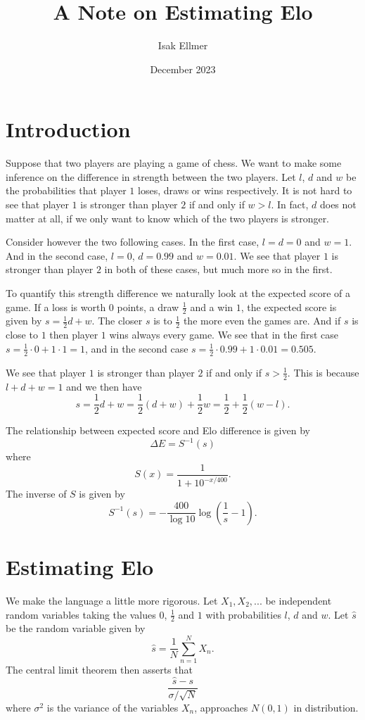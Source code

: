 \documentclass{article}
\title{A Note on Estimating Elo}
\author{Isak Ellmer}
\date{December 2023}
\theoremstyle{plain}
\theoremstyle{definition}
\begin{document}
\maketitle

\section{Introduction}
Suppose that two players are playing a game of chess. We want to make some inference
on the difference in strength between the two players. Let $l$, $d$ and $w$ be the
probabilities that player $1$ loses, draws or wins respectively. It is not hard to see
that player $1$ is stronger than player $2$ if and only if $w>l$. In fact, $d$ does not
matter at all, if we only want to know which of the two players is stronger.

Consider however the two following cases. In the first case, $l=d=0$ and $w=1$. And in
the second case, $l=0$, $d=0.99$ and $w=0.01$. We see that player $1$ is stronger than
player $2$ in both of these cases, but much more so in the first.

To quantify this
strength difference we naturally look at the expected score of a game. If a loss is worth
$0$ points, a draw $\frac12$ and a win $1$, the expected score is given by
$s=\frac12d+w$. The closer $s$ is to $\frac12$ the more even the games are. And if $s$
is close to $1$ then player $1$ wins always every game. We see that in the first case
$s=\frac12\cdot0+1\cdot1=1$, and in the second case $s=\frac12\cdot0.99+1\cdot0.01=0.505$.

We see that player $1$ is stronger than player $2$ if and only if $s>\frac12$. This is
because $l+d+w=1$ and we then have
$$s=\frac12d+w=\frac12(d+w)+\frac12w=\frac12+\frac12(w-l).$$

The relationship between expected score and Elo difference \cite{wikipedia_elo} is given
by $$\Delta E=S^{-1}(s)$$ where $$S(x)=\frac1{1+10^{-x/400}}.$$ The inverse of $S$
is given by $$S^{-1}(s)=-\frac{400}{\log10}\log\left(\frac1s-1\right).$$

\section{Estimating Elo}\label{confidence}
We make the language a little more rigorous. Let $X_1,X_2,...$ be independent
random variables taking the values $0$, $\frac12$ and $1$ with probabilities
$l$, $d$ and $w$. Let $\hat s$ be the random variable
given by $$\hat s=\frac1N\sum_{n=1}^NX_n.$$
The central limit theorem \cite{wikipedia_clt} then asserts that
$$\frac{\hat s-s}{\sigma/\sqrt{N}}$$ where $\sigma^2$
is the variance of the variables $X_n$, approaches $N(0,1)$ in distribution.
\end{document}
